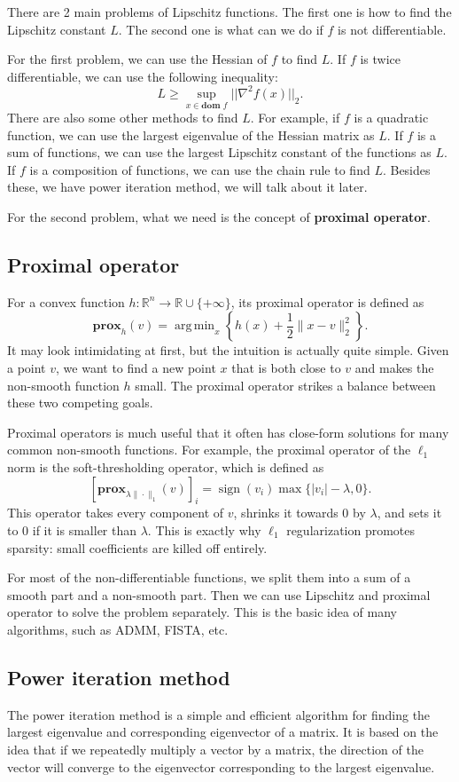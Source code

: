 \documentclass[lang=en,color=blue,mode=fancy,titlestyle=hang]{elegantbook}
\DeclareMathOperator*{\argmin}{arg\,min}
\begin{document}
There are 2 main problems of Lipschitz functions. The first one is how to find the Lipschitz
constant $L$. The second one is what can we do if $f$ is not differentiable.

For the first problem, we can use the Hessian of $f$ to find $L$. If $f$ is twice differentiable,
we can use the following inequality:
\[
L \geq \sup_{x \in \textbf{dom } f} ||\nabla^2 f(x)||_2.
\]
There are also some other methods to find $L$. For example, if $f$ is a quadratic function, we can
use the largest eigenvalue of the Hessian matrix as $L$. If $f$ is a sum of functions, we can use the
largest Lipschitz constant of the functions as $L$. If $f$ is a composition of functions, we can use
the chain rule to find $L$. Besides these, we have power iteration method, we will talk about it later.

For the second problem, what we need is the concept of \textbf{proximal operator}.

\subsection{Proximal operator}
For a convex function $h: \mathbb{R}^n \to \mathbb{R} \cup \{+\infty\}$, its proximal operator is defined as
\[
\mathbf{prox}_h(v) = \argmin_{x} \left\{ h(x) + \frac{1}{2} \|x - v\|_2^2 \right\}.
\]
It may look intimidating at first, but the intuition is actually quite simple. Given a point $v$,
we want to find a new point $x$ that is both close to $v$ and makes the non-smooth function $h$ small.
The proximal operator strikes a balance between these two competing goals.

Proximal operators is much useful that it often has close-form solutions for many common non-smooth
functions. For example, the proximal operator of the $\ell_1$ norm is the soft-thresholding operator,
which is defined as
\[
[\mathbf{prox}_{\lambda \|\cdot\|_1}(v)]_i = \operatorname{sign}(v_i) \max\{|v_i| - \lambda, 0\}.
\]
This operator takes every component of $v$, shrinks it towards 0 by $\lambda$, and sets it to 0 if it
is smaller than $\lambda$. This is exactly why $\ell_1$ regularization promotes sparsity: small
coefficients are killed off entirely.

For most of the non-differentiable functions, we split them into a sum of a smooth part and a
non-smooth part. Then we can use Lipschitz and proximal operator to solve the problem separately.
This is the basic idea of many algorithms, such as  ADMM, FISTA, etc.

\subsection{Power iteration method}
The power iteration method is a simple and efficient algorithm for finding the largest eigenvalue
and corresponding eigenvector of a matrix. It is based on the idea that if we repeatedly multiply
a vector by a matrix, the direction of the vector will converge to the eigenvector corresponding
to the largest eigenvalue.
\end{document}
